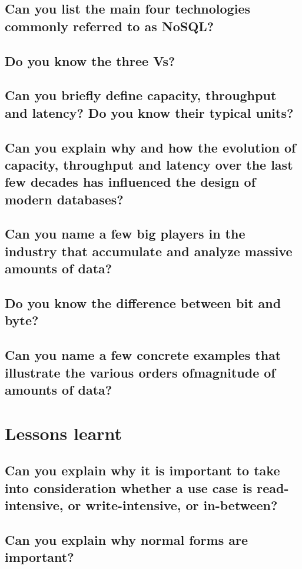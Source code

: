 \documentclass{article}
\begin{document}
\subsection{Can you list the main four technologies commonly referred to as NoSQL?}
\subsection{Do you know the three Vs?}
\subsection{Can you briefly define capacity, throughput and latency? Do you know their typical units?}
\subsection{Can you explain why and how the evolution of capacity, throughput and latency over the last few decades has influenced the design of modern databases?}
\subsection{Can you name a few big players in the industry that accumulate and analyze massive amounts of data?}
\subsection{Do you know the difference between bit and byte?}
\subsection{Can you name a few concrete examples that illustrate the various orders ofmagnitude of amounts of data?}

\pagebreak

\section{Lessons learnt}
\subsection{Can you explain why it is important to take into consideration whether a use case is read-intensive, or write-intensive, or in-between?}
\subsection{Can you explain why normal forms are important?}
\end{document}
